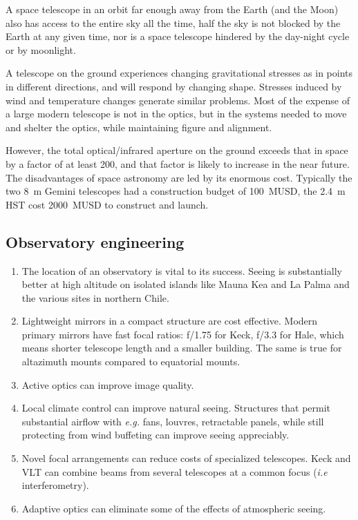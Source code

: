 A space telescope in an orbit far enough away from the Earth (and the Moon) also has access 
to the entire sky all the time, half the sky is not blocked by the Earth at any given time, 
nor is a space telescope hindered by the day-night cycle or by moonlight.

A telescope on the ground experiences changing gravitational stresses as in points in different
directions, and will respond by changing shape. Stresses induced by wind and temperature changes
generate similar problems. Most of the expense of a large modern telescope is not in the optics, 
but in the systems needed to move and shelter the optics, while maintaining figure and alignment.

However, the total optical/infrared aperture on the ground exceeds that in space by a factor of
at least 200, and that factor is likely to increase in the near future. The disadvantages of
space astronomy are led by its enormous cost. Typically the two 8~m Gemini telescopes had a 
construction budget of 100~MUSD, the 2.4~m HST cost 2000~MUSD to construct and launch.

\subsection{Observatory engineering}

\begin{enumerate}
\item The location of an observatory is vital to its success. Seeing is substantially better
at high altitude on isolated islands like Mauna Kea and La Palma and the various sites in 
northern Chile. 
\item Lightweight mirrors in a compact structure are cost effective. Modern primary mirrors
have fast focal ratios: f/1.75 for Keck, f/3.3 for Hale, which means shorter telescope length 
and a smaller building. The same is true for altazimuth mounts compared to equatorial mounts.
\item Active optics can improve image quality.
\item Local climate control can improve natural seeing. Structures that permit substantial
airflow with {\it e.g.} fans, louvres, retractable panels, while still protecting from 
wind buffeting can improve seeing appreciably.
\item Novel focal arrangements can reduce costs of specialized telescopes. Keck and VLT can 
combine beams from several telescopes at a common focus ({\it i.e} interferometry).
\item Adaptive optics can eliminate some of the effects of atmospheric seeing.
\end{enumerate}

